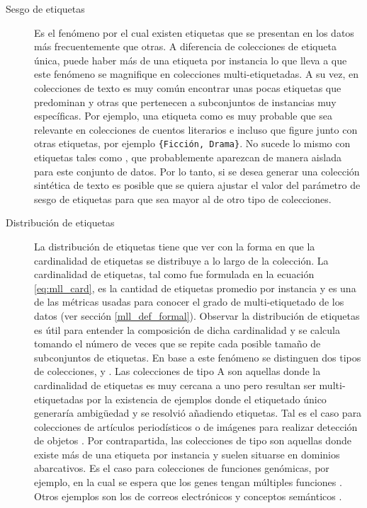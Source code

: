 \begin{description}

   \item[Sesgo de etiquetas] Es el fenómeno por el cual existen etiquetas que se
      presentan en los datos más frecuentemente que otras. A diferencia de
      colecciones de etiqueta única, puede haber más de una etiqueta por
      instancia lo que lleva a que este fenómeno se magnifique en colecciones
      multi-etiquetadas. A su vez, en colecciones de texto es muy común
      encontrar unas pocas etiquetas que predominan y otras que pertenecen a
      subconjuntos de instancias muy específicas. Por ejemplo, una etiqueta como
       es muy probable que sea relevante en
      colecciones de cuentos literarios e incluso que figure junto con otras
      etiquetas, por ejemplo \texttt{\{Ficción, Drama\}}.  No sucede lo mismo
      con etiquetas tales como , que probablemente
      aparezcan de manera aislada para este conjunto de datos.  Por lo tanto, si
      se desea generar una colección sintética de texto es posible que se quiera
      ajustar el valor del parámetro de sesgo de etiquetas para que sea mayor al
      de otro tipo de colecciones.

   \item[Distribución de etiquetas] La distribución de etiquetas tiene que ver
      con la forma en que la cardinalidad de etiquetas se distribuye a lo largo
      de la colección. La cardinalidad de etiquetas, tal como fue formulada en
      la ecuación \ref{eq:mll_card}, es la cantidad de etiquetas promedio por
      instancia y es una de las métricas usadas para conocer el grado de
      multi-etiquetado de los datos (ver sección \ref{mll_def_formal}). Observar
      la distribución de etiquetas es útil para entender la composición de dicha
      cardinalidad y se calcula tomando el número de veces que se repite cada
      posible tamaño de subconjuntos de etiquetas. En base a este fenómeno se
      distinguen dos tipos de colecciones,  y . Las
      colecciones de tipo A son aquellas donde la cardinalidad de etiquetas es
      muy cercana a uno pero resultan ser multi-etiquetadas por la existencia de
      ejemplos donde el etiquetado único generaría ambigüedad y se resolvió
      añadiendo etiquetas. Tal es el caso para colecciones de artículos
      periodísticos \cite{lang_newsweeder_1995} o de imágenes para realizar
      detección de objetos \cite{boutell_learning_2004}. Por contrapartida, las
      colecciones de tipo  son aquellas donde existe más de una
      etiqueta por instancia y suelen situarse en dominios abarcativos. Es el
      caso para colecciones de funciones genómicas, por ejemplo, en la cual se
      espera que los genes tengan múltiples funciones
      \cite{diplaris_protein_2005}.  Otros ejemplos son los de correos
      electrónicos \cite{hutchison_enron_2004} y conceptos semánticos
      \cite{snoek_challenge_2006}.


\end{description}

